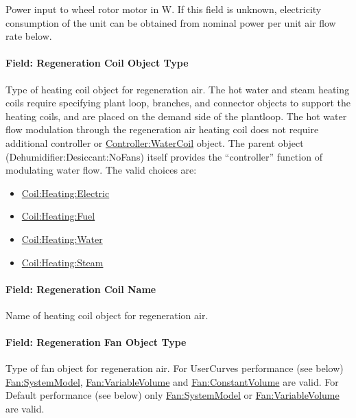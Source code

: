 Power input to wheel rotor motor in W. If this field is unknown, electricity consumption of the unit can be obtained from nominal power per unit air flow rate below.

\paragraph{Field: Regeneration Coil Object Type}\label{field-regeneration-coil-object-type}

Type of heating coil object for regeneration air. The hot water and steam heating coils require specifying plant loop, branches, and connector objects to support the heating coils, and are placed on the demand side of the plantloop. The hot water flow modulation through the regeneration air heating coil does not require additional controller or \hyperref[controllerwatercoil]{Controller:WaterCoil} object. The parent object (Dehumidifier:Desiccant:NoFans) itself provides the ``controller'' function of modulating water flow. The valid choices are:

\begin{itemize}
\item
  \hyperref[coilheatingelectric]{Coil:Heating:Electric}
\item
  \hyperref[coilheatinggas-000]{Coil:Heating:Fuel}
\item
  \hyperref[coilheatingwater]{Coil:Heating:Water}
\item
  \hyperref[coilheatingsteam]{Coil:Heating:Steam}
\end{itemize}

\paragraph{Field: Regeneration Coil Name}\label{field-regeneration-coil-name}

Name of heating coil object for regeneration air.

\paragraph{Field: Regeneration Fan Object Type}\label{field-regeneration-fan-object-type}

Type of fan object for regeneration air. For UserCurves performance (see below) \hyperref[fansystemmodel]{Fan:SystemModel}, \hyperref[fanvariablevolume]{Fan:VariableVolume} and \hyperref[fanconstantvolume]{Fan:ConstantVolume} are valid. For Default performance (see below) only \hyperref[fansystemmodel]{Fan:SystemModel} or \hyperref[fanvariablevolume]{Fan:VariableVolume} are valid.

